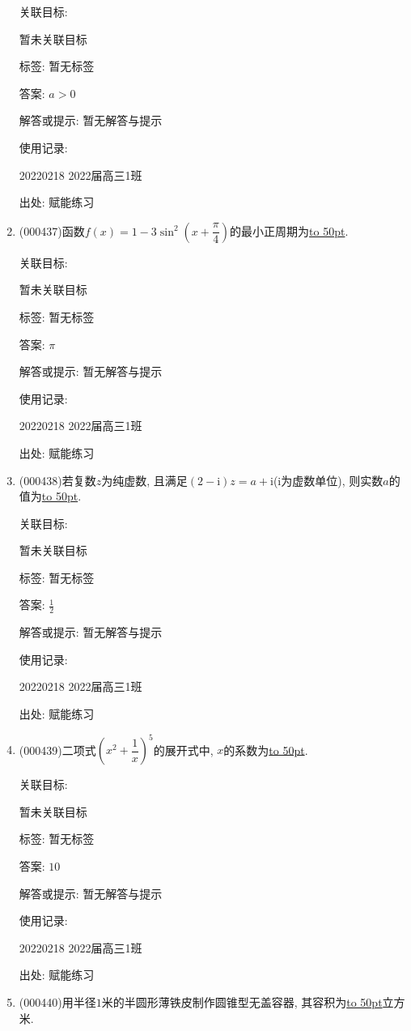 \documentclass[10pt,a4paper]{article}
\newcommand{\blank}[1]{\underline{\hbox to #1pt{}}}
\begin{document}
\begin{enumerate}[1.]
关联目标:

暂未关联目标



标签: 暂无标签

答案: $a>0$

解答或提示: 暂无解答与提示

使用记录:

20220218	2022届高三1班	


出处: 赋能练习
\item { (000437)}函数$f(x)=1-3\sin ^2(x+\dfrac\pi 4)$的最小正周期为\blank{50}.


关联目标:

暂未关联目标



标签: 暂无标签

答案: $\pi$

解答或提示: 暂无解答与提示

使用记录:

20220218	2022届高三1班	


出处: 赋能练习
\item { (000438)}若复数$z$为纯虚数, 且满足$(2-\mathrm{i})z=a+\mathrm{i}$($\mathrm{i}$为虚数单位), 则实数$a$的值为\blank{50}.


关联目标:

暂未关联目标



标签: 暂无标签

答案: $\frac 12$

解答或提示: 暂无解答与提示

使用记录:

20220218	2022届高三1班	


出处: 赋能练习
\item { (000439)}二项式$(x^2+\dfrac 1x)^5$的展开式中, $x$的系数为\blank{50}.


关联目标:

暂未关联目标



标签: 暂无标签

答案: $10$

解答或提示: 暂无解答与提示

使用记录:

20220218	2022届高三1班	


出处: 赋能练习
\item { (000440)}用半径$1$米的半圆形薄铁皮制作圆锥型无盖容器, 其容积为\blank{50}立方米.



\end{enumerate}
\end{document}
